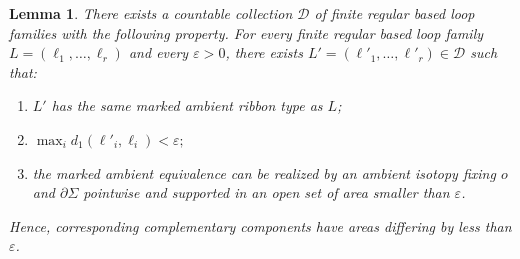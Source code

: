 \documentclass[11pt,a4paper,reqno]{article}
\newtheorem{lemma}[theorem]{Lemma}
\theoremstyle{definition}
\theoremstyle{remark}
\begin{document}
\begin{lemma}\label{lem:countable-dense-regular-families}
There exists a countable collection $\mathscr D$ of finite regular based loop families with the following property. For every finite regular based loop family $L=(\ell_1,\ldots,\ell_r)$ and every $\varepsilon>0$, there exists $L'=(\ell'_1,\ldots,\ell'_r)\in\mathscr D$ such that:
\begin{enumerate}
\item $L'$ has the same marked ambient ribbon type as $L$;
\item $\max_i d_1(\ell'_i,\ell_i)<\varepsilon;$
\item the marked ambient equivalence can be realized by an ambient isotopy fixing $o$ and $\partial\Sigma$ pointwise and supported in an open set of area smaller than $\varepsilon$.
\end{enumerate}
Hence, corresponding complementary components have areas differing by less than $\varepsilon$.
\end{lemma}
\end{document}
